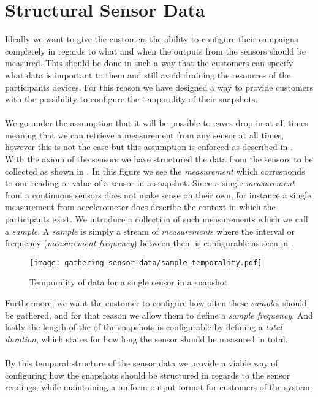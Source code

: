 \section{Structural Sensor Data}
\label{sec:structural_sensor_data}

Ideally we want to give the customers the ability to configure their campaigns completely in regards to what and when the outputs from the sensors should be measured. This should be done in such a way that the customers can specify what data is important to them and still avoid draining the resources of the participants devices. For this reason we have designed a way to provide customers with the possibility to configure the temporality of their snapshots. 
\\\\
We go under the assumption that it will be possible to eaves drop in at all times meaning that we can retrieve a measurement from any sensor at all times, however this is not the case but this assumption is enforced as described in . With the axiom of the sensors we have structured the data from the sensors to be collected as shown in . In this figure we see the \emph{measurement} which corresponds to one reading or value of a sensor in a snapshot. Since a single \emph{measurement} from a continuous sensors does not make sense on their own, for instance a single measurement from accelerometer does describe the context in which the participants exist. We introduce a collection of such measurements which we call a \emph{sample}. A \emph{sample} is simply a stream of \emph{measurement}s where the interval or frequency (\emph{measurement frequency}) between them is configurable as seen in .

\begin{figure}[!htbp]
    \centering
    \texttt{[image: gathering\_sensor\_data/sample\_temporality.pdf]}
    \caption{Temporality of data for a single sensor in a snapshot.}
    \label{fig:sample_temporality}
\end{figure}
\FloatBarrier

Furthermore, we want the customer to configure how often these \emph{sample}s should be gathered, and for that reason we allow them to define a \emph{sample frequency}. And lastly the length of the of the snapshots is configurable by defining a \emph{total duration}, which states for how long the sensor should be measured in total.
\\\\
By this temporal structure of the sensor data we provide a viable way of configuring how the snapshots should be structured in regards to the sensor readings, while maintaining a uniform output format for customers of the system.

